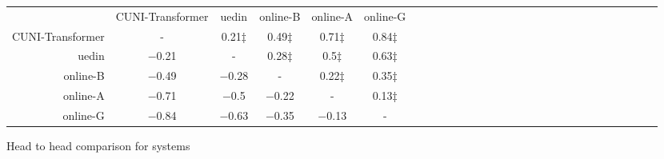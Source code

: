 \begin{tabular}{rccccccccccccccccccccccccccc}

 & CUNI-Transformer & uedin & online-B & online-A & online-G \\ 
CUNI-Transformer & - &    0.21$\ddagger$ &    0.49$\ddagger$ &    0.71$\ddagger$ &    0.84$\ddagger$ \\ 
uedin & $-$0.21 & - &    0.28$\ddagger$ &    0.5$\ddagger$ &    0.63$\ddagger$ \\ 
online-B & $-$0.49 & $-$0.28 & - &    0.22$\ddagger$ &    0.35$\ddagger$ \\ 
online-A & $-$0.71 & $-$0.5 & $-$0.22 & - &    0.13$\ddagger$ \\ 
online-G & $-$0.84 & $-$0.63 & $-$0.35 & $-$0.13 & - \\ 


\end{tabular}
\caption{Head to head comparison for \enCS systems}
\label{pairwise-encs}


